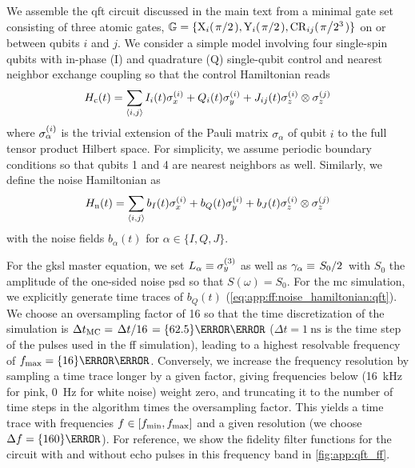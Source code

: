 We assemble the \gls{qft} circuit discussed in the main text from a minimal gate set consisting of three atomic gates, $\mathbb{G} = \lbrace\mr{X}_{i}(\flatfrac{\pi}{2}),\mr{Y}_{i}(\flatfrac{\pi}{2}),\mr{CR}_{ij}(\flatfrac{\pi}{2^3})\rbrace$ on or between qubits $i$ and $j$.
We consider a simple model involving four single-spin qubits with in-phase (I) and quadrature (Q) single-qubit control and nearest neighbor exchange coupling so that the control Hamiltonian reads
\begin{equation}\label{eq:app:ff:control_hamiltonian:qft}
    H_{\mathrm{c}}(t) = \sum_{\langle i,j\rangle} I_i(t)\sigma_x^{(i)} + Q_i(t)\sigma_y^{(i)} + J_{ij}(t)\sigma_z^{(i)}\otimes\sigma_z^{(j)}
\end{equation}
where $\sigma_\alpha^{(i)}$ is the trivial extension of the Pauli matrix $\sigma_\alpha$ of qubit $i$ to the full tensor product Hilbert space.
For simplicity, we assume periodic boundary conditions so that qubits 1 and 4 are nearest neighbors as well.
Similarly, we define the noise Hamiltonian as
\begin{equation}\label{eq:app:ff:noise_hamiltonian:qft}
    H_{\mathrm{n}}(t) = \sum_{\langle i,j\rangle} b_{I}(t)\sigma_x^{(i)} + b_{Q}(t)\sigma_y^{(i)} + b_{J}(t)\sigma_z^{(i)}\otimes\sigma_z^{(j)}
\end{equation}
with the noise fields $b_{\alpha}(t)$ for $\alpha\in\{I,Q,J\}$.

For the \gls{gksl} master equation, we set $L_\alpha\equiv\sigma_y^{(3)}$ as well as $\gamma_\alpha\equiv\flatfrac{S_0}{2}$ with $S_0$ the amplitude of the one-sided noise \gls{psd} so that $S(\omega) = S_0$.
For the \gls{mc} simulation, we explicitly generate time traces of $b_Q(t)$ (\cf \cref{eq:app:ff:noise_hamiltonian:qft}).
We choose an oversampling factor of 16 so that the time discretization of the simulation is $\Delta t_\mr{MC} = \flatfrac{\Delta t}{16} = \qty{62.5}{\pico\second}$ ($\Delta t = \qty{1}{\nano\second}$ is the time step of the pulses used in the \gls{ff} simulation), leading to a highest resolvable frequency of $\fmax = \qty{16}{\giga\hertz}$.
Conversely, we increase the frequency resolution by sampling a time trace longer by a given factor, giving frequencies below \fmin (\qty{16}{\kilo\hertz} for pink, \qty{0}{\hertz} for white noise) weight zero, and truncating it to the number of time steps in the algorithm times the oversampling factor.
This yields a time trace with frequencies $f\in [f_{\mathrm{min}}, f_{\mathrm{max}}]$ and a given resolution (we choose $\df = \qty{160}{\hertz}$).
For reference, we show the fidelity filter functions for the circuit with and without echo pulses in this frequency band in \cref{fig:app:qft_ff}.

